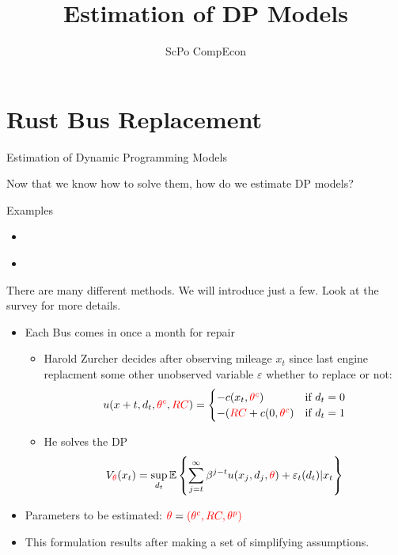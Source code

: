 \documentclass[english]{beamer}
\begin{document}
\title{Estimation of DP Models}

\subtitle{ScPo CompEcon}


\frame{\titlepage} 


\section{Rust Bus Replacement}

\begin{frame}
\tableofcontents[currentsection] 
\end{frame}





\begin{frame}{Estimation of Dynamic Programming Models}
\begin{midi}
\item Now that we know how to solve them, how do we estimate DP models?
\item Examples
\begin{itemize}
\item \cite{rustbus}
\item \cite{BLP}
\end{itemize}
\item There are many different methods. We will introduce just a few. Look at the survey \cite{Aguirre} for more details.
\end{midi}
\end{frame}

\begin{frame}{\cite{rustbus}}
\begin{itemize}
\item Each Bus comes in once a month for repair
\begin{itemize}
\item Harold Zurcher decides after observing mileage $x_t$ since last engine replacment  some other unobserved variable $\varepsilon$ whether to replace or not:
\begin{equation*}
u(x+t,d_t,{\color{red}{\theta^c}},{\color{red}{RC}}) = \begin{cases}-c(x_t,{\color{red}{\theta^c}}) & \text{if }d_t=0 \\ 
                                                  -({\color{red}{RC}} + c(0,{\color{red}{\theta^c}}) & \text{if }d_t=1
  \end{cases}
\end{equation*}

\item He solves the DP
\begin{equation*}
V_{\color{red}{\theta}}(x_t) = \sup_{d_t} \mathbb{E}\left\{ \sum_{j=t}^\infty \beta^{j-t} u(x_j,d_j,{\color{red}{\theta}}) + \varepsilon_t(d_t) |x_t \right\}
\end{equation*}
\end{itemize}
\item Parameters to be estimated: ${\color{red}{\theta}} = {\color{red}{(\theta^c,RC,\theta^p)}}$
\item This formulation results after making a set of simplifying assumptions.
\end{itemize}
\end{frame}
\end{document}
